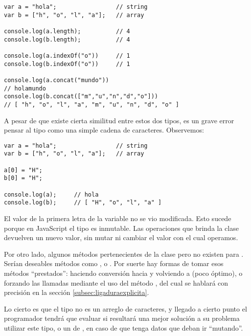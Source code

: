 \begin{lstlisting}[title={Similitudes entre \code{string} y un \code{array}}]
var a = "hola";                 // string
var b = ["h", "o", "l", "a"];   // array

console.log(a.length);          // 4
console.log(b.length);          // 4

console.log(a.indexOf("o"))     // 1
console.log(b.indexOf("o"))     // 1

console.log(a.concat("mundo"))  
// holamundo
console.log(b.concat(["m","u","n","d","o"]))
// ​​​​​[ "h", "o", "l", "a", "m", "u", "n", "d", "o" ]​​​​​
\end{lstlisting}

A pesar de que existe cierta similitud entre estos dos tipos, es un grave error pensar al tipo  como una simple cadena de caracteres. Observemos:

\begin{lstlisting}
var a = "hola";                 // string
var b = ["h", "o", "l", "a"];   // array

a[0] = "H";
b[0] = "H";

console.log(a);		// hola
console.log(b);		// ​​​​​[ "H", "o", "l", "a" ]​​​​​
\end{lstlisting}

El valor de la primera letra de la variable  no se vio modificada. Esto sucede porque en JavaScript el tipo  es inmutable. Las operaciones que brinda la clase  devuelven un nuevo valor, sin mutar ni cambiar el valor con el cual operamos.

Por otro lado, algunos métodos pertenecientes de la clase  pero no existen para . Serían deseables métodos como ,  o . Por suerte hay formas de tomar esos métodos "`prestados"': haciendo conversión hacia  y volviendo a  (poco óptimo), o forzando las llamadas mediante el uso del método , del cual se hablará con precisión en la sección \ref{subsec:ligaduraexplicita}.

Lo cierto es que el tipo  no es un arreglo de caracteres, y llegado a cierto punto el programador tendrá que evaluar si resultará una mejor solución a su problema utilizar este tipo, o un  de , en caso de que tenga datos que deban ir "`mutando"'.

\subsection{}

